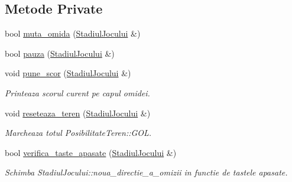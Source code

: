 \subsection*{Metode Private}
\begin{DoxyCompactItemize}
\item 
bool \hyperlink{classJoc_afd69d2cd19f6d2ac2b1a42a4685349e6}{muta\+\_\+omida} (\hyperlink{classStadiulJocului}{Stadiul\+Jocului} \&)
\item 
bool \hyperlink{classJoc_a0f90008558e8cbed6537b542f79ae55b}{pauza} (\hyperlink{classStadiulJocului}{Stadiul\+Jocului} \&)
\item 
\mbox{\label{classJoc_a8e709a64cfcd3277975fb58f1bff3cd1}} 
void \hyperlink{classJoc_a8e709a64cfcd3277975fb58f1bff3cd1}{pune\+\_\+scor} (\hyperlink{classStadiulJocului}{Stadiul\+Jocului} \&)
\begin{DoxyCompactList}\small\item\em Printeaza scorul curent pe capul omidei. \end{DoxyCompactList}\item 
\mbox{\label{classJoc_a548406580ddf763a17061190fba3756e}} 
void \hyperlink{classJoc_a548406580ddf763a17061190fba3756e}{reseteaza\+\_\+teren} (\hyperlink{classStadiulJocului}{Stadiul\+Jocului} \&)
\begin{DoxyCompactList}\small\item\em Marcheaza totul Posibilitate\+Teren\+::\+G\+OL. \end{DoxyCompactList}\item 
bool \hyperlink{classJoc_afe57540f76b33492c721c14726a89d86}{verifica\+\_\+taste\+\_\+apasate} (\hyperlink{classStadiulJocului}{Stadiul\+Jocului} \&)
\begin{DoxyCompactList}\small\item\em Schimba Stadiul\+Jocului\+::noua\+\_\+directie\+\_\+a\+\_\+omizii in functie de tastele apasate. \end{DoxyCompactList}\end{DoxyCompactItemize}
